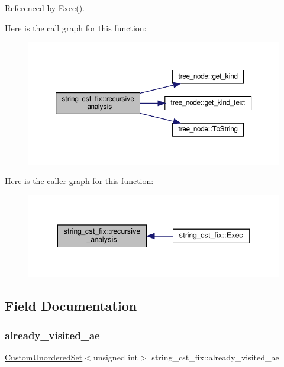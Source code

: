 Referenced by Exec().

Here is the call graph for this function\+:
\nopagebreak
\begin{figure}[H]
\begin{center}
\leavevmode
\includegraphics[width=350pt]{d0/daa/classstring__cst__fix_a2f68c8aa5c58dc2db4ba9f25a02d3160_cgraph}
\end{center}
\end{figure}
Here is the caller graph for this function\+:
\nopagebreak
\begin{figure}[H]
\begin{center}
\leavevmode
\includegraphics[width=341pt]{d0/daa/classstring__cst__fix_a2f68c8aa5c58dc2db4ba9f25a02d3160_icgraph}
\end{center}
\end{figure}


\subsection{Field Documentation}
\mbox{\label{classstring__cst__fix_a7ff7f8e1afa38b3b092676ced537f35c}} 
\subsubsection{\texorpdfstring{already\+\_\+visited\+\_\+ae}{already\_visited\_ae}}
{\footnotesize\ttfamily \hyperlink{classCustomUnorderedSet}{Custom\+Unordered\+Set}$<$unsigned int$>$ string\+\_\+cst\+\_\+fix\+::already\+\_\+visited\+\_\+ae\hspace{0.3cm}{\ttfamily [protected]}}



